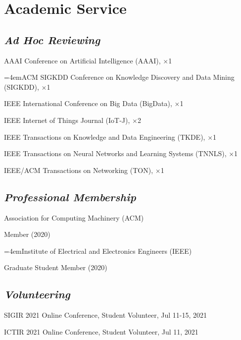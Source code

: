 
\vspace{-8pt}
\section*{Academic Service}
\vspace{-4pt}


\subsection*{\textnormal{\textit{Ad Hoc Reviewing}}}
\vspace{-4pt}
\indent

AAAI Conference on Artificial Intelligence (AAAI), $\times$1

\hangindent=4emACM SIGKDD Conference on Knowledge Discovery and Data Mining (SIGKDD), $\times$1

IEEE International Conference on Big Data (BigData), $\times$1

IEEE Internet of Things Journal (IoT-J), $\times$2

IEEE Transactions on Knowledge and Data Engineering (TKDE), $\times$1

IEEE Transactions on Neural Networks and Learning Systems (TNNLS), $\times$1

IEEE/ACM Transactions on Networking (TON), $\times$1

\subsection*{\textnormal{\textit{Professional Membership}}}
\vspace{-4pt}
\indent 

Association for Computing Machinery (ACM)  

\hspace{2em}Member (2020)

\hangindent=4emInstitute of Electrical and Electronics Engineers (IEEE)

\hspace{2em}Graduate Student Member (2020)



\subsection*{\textnormal{\textit{Volunteering}}}
\vspace{-4pt}
\indent 

SIGIR 2021 Online Conference, Student Volunteer, Jul 11-15, 2021

ICTIR 2021 Online Conference, Student Volunteer, Jul 11, 2021